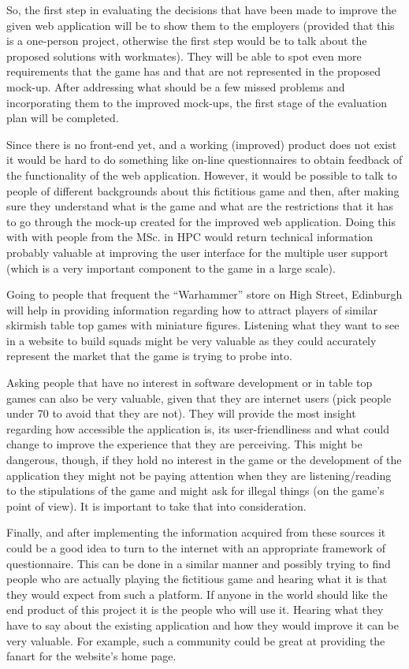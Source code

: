 \documentclass[12pt,a4paper]{article}
\begin{document}
So, the first step in evaluating the decisions that have been made to improve the given web application will be to show them to the employers (provided that this is a one-person project, otherwise the first step would be to talk about the proposed solutions with workmates). They will be able to spot even more requirements that the game has and that are not represented in the proposed mock-up. After addressing what should be a few missed problems and incorporating them to the improved mock-ups, the first stage of the evaluation plan will be completed. 

Since there is no front-end yet, and a working (improved) product does not exist it would be hard to do something like on-line questionnaires to obtain feedback of the functionality of the web application. However, it would be possible to talk to people of different backgrounds about this fictitious game and then, after making sure they understand what is the game and what are the restrictions that it has to go through the mock-up created for the improved web application. Doing this with with people from the MSc. in HPC would return technical information probably valuable at improving the user interface for the multiple user support (which is a very important component to the game in a large scale). 

Going to people that frequent the ``Warhammer'' store on High Street, Edinburgh will help in providing information regarding how to attract players of similar skirmish table top games with miniature figures. Listening what they want to see in a website to build squads might be very valuable as they could accurately represent the market that the game is trying to probe into. 

Asking people that have no interest in software development or in table top games can also be very valuable, given that they are internet users (pick people under 70 to avoid that they are not). They will provide the most insight regarding how accessible the application is, its user-friendliness and what could change to improve the experience that they are perceiving. This might be dangerous, though, if they hold no interest in the game or the development of the application they might not be paying attention when they are listening/reading to the stipulations of the game and might ask for illegal things (on the game's point of view). It is important to take that into consideration.

Finally, and after implementing the information acquired from these sources it could be a good idea to turn to the internet with an appropriate framework of questionnaire. This can be done in a similar manner and possibly trying to find people who are actually playing the fictitious game and hearing what it is that they would expect from such a platform. If anyone in the world should like the end product of this project it is the people who will use it. Hearing what they have to say about the existing application and how they would improve it can be very valuable. For example, such a community could be great at providing the fanart for the website's home page.
\end{document}
